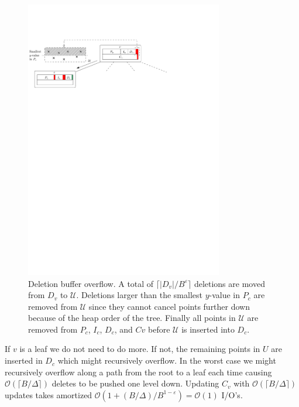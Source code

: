 \documentclass[twoside,11pt,openright]{report}
\def \epsilon {\varepsilon}
\begin{document}
\begin{enumerate}[label=(\roman*)]
\clearpage	

	\begin{figure}[t]
		\centering
		\includegraphics[width=0.77\textwidth]{../figures/brodal_deletion_buffer_overflow}
		\caption{Deletion buffer overflow. A total of $\lceil \lvert D_v \rvert /B^\epsilon \rceil$ deletions are moved from $D_v$ to $\mathcal{U}$. Deletions larger than the smallest $y$-value in $P_c$ are removed from $\mathcal{U}$ since they cannot cancel points further down because of the heap order of the tree. Finally all points in $\mathcal{U}$ are removed from $P_c$, $I_c$, $D_c$, and $Cv$ before $\mathcal{U}$ is inserted into $D_c$.}
		\label{fig:brodal_deletion_buffer_overflow}
	\end{figure}
	
	If $v$ is a leaf we do not need to do more. If not, the remaining points in $U$ are inserted in $D_c$ which might recursively overflow. In the worst case we might recursively overflow along a path from the root to a leaf each time causing $\mathcal{O}(\lceil B / \Delta \rceil)$ deletes to be pushed one level down. Updating $C_v$ with $\mathcal{O}(\lceil B / \Delta \rceil)$ updates takes amortized $\mathcal{O}(1+ (B/\Delta) / B^{1-\epsilon}) = \mathcal{O}(1)$ I/O's.
	

\end{enumerate}
\end{document}
